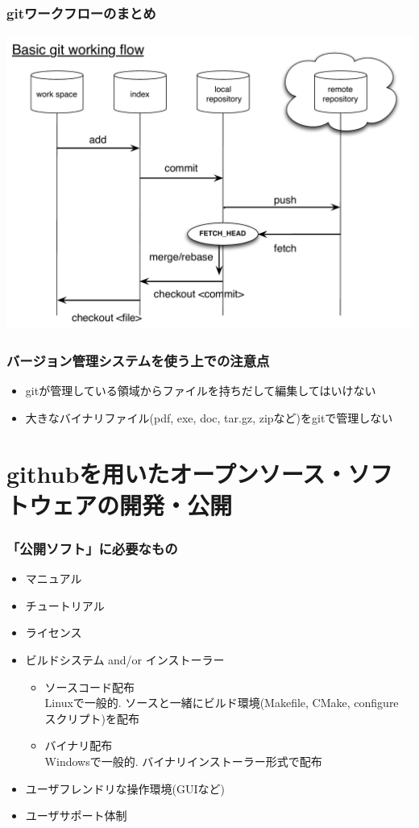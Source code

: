 \begin{frame}
  \frametitle{gitワークフローのまとめ}
  \begin{center}
    \includegraphics[height=.8\textheight]{../workflow/git-diagram.pdf}
  \end{center}
\end{frame}

\begin{frame}
  \frametitle{バージョン管理システムを使う上での注意点}
  \begin{itemize}
    \setlength{\itemsep}{1em}
  \item gitが管理している領域からファイルを持ちだして編集してはいけない
  \item 大きなバイナリファイル(pdf, exe, doc, tar.gz, zipなど)をgitで管理しない
  \end{itemize}
\end{frame}

\section{githubを用いたオープンソース・ソフトウェアの開発・公開}

\begin{frame}
  \frametitle{「公開ソフト」に必要なもの}
  \begin{itemize}
  \item マニュアル
  \item チュートリアル
  \item ライセンス
  \item ビルドシステム and/or インストーラー
    \begin{itemize}
    \item ソースコード配布 \\
      Linuxで一般的. ソースと一緒にビルド環境(Makefile, CMake, configure スクリプト)を配布
    \item バイナリ配布 \\
      Windowsで一般的. バイナリインストーラー形式で配布
    \end{itemize}
  \item ユーザフレンドリな操作環境(GUIなど)
  \item ユーザサポート体制
  \end{itemize}
\end{frame}

